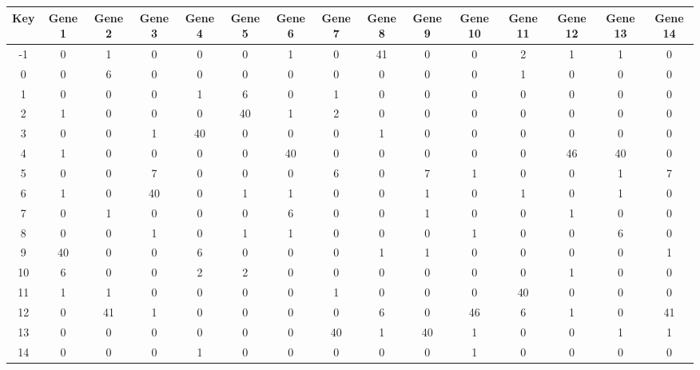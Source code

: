 \begin{tabular}{|c|c|c|c|c|c|c|c|c|c|c|c|c|c|c|}
\hline
Key & Gene 1 & Gene 2 & Gene 3 & Gene 4 & Gene 5 & Gene 6 & Gene 7 & Gene 8 & Gene 9 & Gene 10 & Gene 11 & Gene 12 & Gene 13 & Gene 14 \\
\hline
-1 & 0 & 1 & 0 & 0 & 0 & 1 & 0 & 41 & 0 & 0 & 2 & 1 & 1 & 0 \\
0 & 0 & 6 & 0 & 0 & 0 & 0 & 0 & 0 & 0 & 0 & 1 & 0 & 0 & 0 \\
1 & 0 & 0 & 0 & 1 & 6 & 0 & 1 & 0 & 0 & 0 & 0 & 0 & 0 & 0 \\
2 & 1 & 0 & 0 & 0 & 40 & 1 & 2 & 0 & 0 & 0 & 0 & 0 & 0 & 0 \\
3 & 0 & 0 & 1 & 40 & 0 & 0 & 0 & 1 & 0 & 0 & 0 & 0 & 0 & 0 \\
4 & 1 & 0 & 0 & 0 & 0 & 40 & 0 & 0 & 0 & 0 & 0 & 46 & 40 & 0 \\
5 & 0 & 0 & 7 & 0 & 0 & 0 & 6 & 0 & 7 & 1 & 0 & 0 & 1 & 7 \\
6 & 1 & 0 & 40 & 0 & 1 & 1 & 0 & 0 & 1 & 0 & 1 & 0 & 1 & 0 \\
7 & 0 & 1 & 0 & 0 & 0 & 6 & 0 & 0 & 1 & 0 & 0 & 1 & 0 & 0 \\
8 & 0 & 0 & 1 & 0 & 1 & 1 & 0 & 0 & 0 & 1 & 0 & 0 & 6 & 0 \\
9 & 40 & 0 & 0 & 6 & 0 & 0 & 0 & 1 & 1 & 0 & 0 & 0 & 0 & 1 \\
10 & 6 & 0 & 0 & 2 & 2 & 0 & 0 & 0 & 0 & 0 & 0 & 1 & 0 & 0 \\
11 & 1 & 1 & 0 & 0 & 0 & 0 & 1 & 0 & 0 & 0 & 40 & 0 & 0 & 0 \\
12 & 0 & 41 & 1 & 0 & 0 & 0 & 0 & 6 & 0 & 46 & 6 & 1 & 0 & 41 \\
13 & 0 & 0 & 0 & 0 & 0 & 0 & 40 & 1 & 40 & 1 & 0 & 0 & 1 & 1 \\
14 & 0 & 0 & 0 & 1 & 0 & 0 & 0 & 0 & 0 & 1 & 0 & 0 & 0 & 0 \\
\hline
\end{tabular}